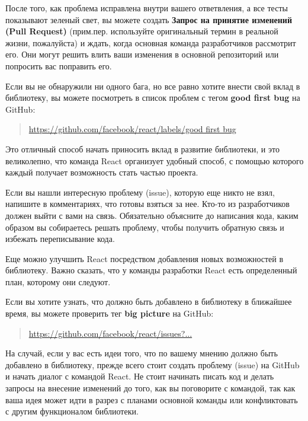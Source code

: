 После того, как проблема исправлена внутри вашего ответвления, а все тесты показывают зеленый свет, вы можете создать \textbf{Запрос на принятие изменений (Pull Request)} (прим.пер. используйте оригинальный термин в реальной жизни, пожалуйста) и ждать, когда основная команда разработчиков рассмотрит его. Они могут решить влить ваши изменения в основной репозиторий или попросить вас поправить его.

Если вы не обнаружили ни одного бага, но все равно хотите внести свой вклад в библиотеку, вы можете посмотреть в список проблем с тегом \textbf{good first bug} на GitHub:

\begin{quotation}
	\href{https://github.com/facebook/react/labels/good\%20first\%20bug}{https://github.com/facebook/react/labels/good first bug}
\end{quotation}

Это отличный способ начать приносить вклад в развитие библиотеки, и это великолепно, что команда React организует удобный способ, с помощью которого каждый получает возможность стать частью проекта.

Если вы нашли интересную проблему (issue), которую еще никто не взял, напишите в комментариях, что готовы взяться за нее. Кто-то из разработчиков должен выйти с вами на связь. Обязательно объясните до написания кода, каким образом вы собираетесь решать проблему, чтобы получить обратную связь и избежать переписывание кода.

Еще можно улучшить React посредством добавления новых возможностей в библиотеку. Важно сказать, что у команды разработки React есть определенный план, которому они следуют.

Если вы хотите узнать, что должно быть добавлено в библиотеку в ближайшее время, вы можете проверить тег \textbf{big picture} на GitHub:

\begin{quotation}
	\href{https://github.com/facebook/react/issues?q=is:open+is:issue+label:\%22big+pict ure\%22}{https://github.com/facebook/react/issues?...}
\end{quotation}

На случай, если у вас есть идеи того, что по вашему мнению должно быть добавлено в библиотеку, прежде всего стоит создать проблему (issue) на GitHub и начать диалог с командой React. Не стоит начинать писать код и делать запросы на внесение изменений до того, как вы поговорите с командой, так как ваша идея может идти в разрез с планами основной команды или конфликтовать с другим функционалом библиотеки.


